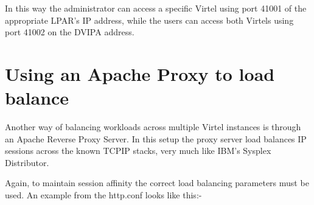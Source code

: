 \documentclass[letterpaper,10pt,english]{sphinxmanual}
\begin{document}
In this way the administrator can access a specific Virtel using port 41001 of the appropriate LPAR’s IP address, while the users can access both Virtels using port 41002 on the DVIPA address.

\newpage


\section{Using an Apache Proxy to load balance}
\label{\detokenize{connectivity_guide:using-an-apache-proxy-to-load-balance}}\label{\detokenize{connectivity_guide:index-175}}
Another way of balancing workloads across multiple Virtel instances is through an Apache Reverse Proxy Server. In this setup the proxy server load balances IP sessions across the known TCPIP stacks, very much like IBM’s Sysplex Distributor.


Again, to maintain session affinity the correct load balancing parameters must be used. An example from the http.conf looks like this:-

\begin{sphinxVerbatim}[commandchars=\\\{\}]
  
  
 
  
  
 
\end{sphinxVerbatim}
\end{document}
